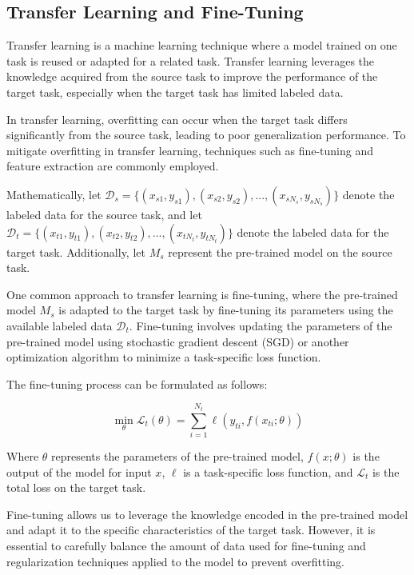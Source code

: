 \documentclass[12pt]{book} %
\begin{document}
\subsection{Transfer Learning and Fine-Tuning}

Transfer learning is a machine learning technique where a model trained on one task is reused or adapted for a related task. Transfer learning leverages the knowledge acquired from the source task to improve the performance of the target task, especially when the target task has limited labeled data.

In transfer learning, overfitting can occur when the target task differs significantly from the source task, leading to poor generalization performance. To mitigate overfitting in transfer learning, techniques such as fine-tuning and feature extraction are commonly employed.

Mathematically, let \( \mathcal{D}_s = \{(x_{s1}, y_{s1}), (x_{s2}, y_{s2}), ..., (x_{sN_s}, y_{sN_s})\} \) denote the labeled data for the source task, and let \( \mathcal{D}_t = \{(x_{t1}, y_{t1}), (x_{t2}, y_{t2}), ..., (x_{tN_t}, y_{tN_t})\} \) denote the labeled data for the target task. Additionally, let \( M_s \) represent the pre-trained model on the source task.

One common approach to transfer learning is fine-tuning, where the pre-trained model \( M_s \) is adapted to the target task by fine-tuning its parameters using the available labeled data \( \mathcal{D}_t \). Fine-tuning involves updating the parameters of the pre-trained model using stochastic gradient descent (SGD) or another optimization algorithm to minimize a task-specific loss function.

The fine-tuning process can be formulated as follows:

\[
\min_{\theta} \mathcal{L}_t(\theta) = \sum_{i=1}^{N_t} \ell(y_{ti}, f(x_{ti}; \theta))
\]

Where \( \theta \) represents the parameters of the pre-trained model, \( f(x; \theta) \) is the output of the model for input \( x \), \( \ell \) is a task-specific loss function, and \( \mathcal{L}_t \) is the total loss on the target task.

Fine-tuning allows us to leverage the knowledge encoded in the pre-trained model and adapt it to the specific characteristics of the target task. However, it is essential to carefully balance the amount of data used for fine-tuning and regularization techniques applied to the model to prevent overfitting.
\end{document}
